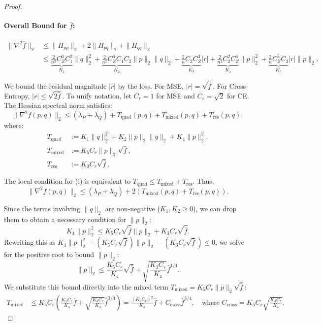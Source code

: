 \documentclass[a4paper,11pt]{article}
\newcommand{\1}{\mathbbm{1}}
\theoremstyle{plain}
\begin{document}
\begin{proof}
\paragraph{Overall Bound for $\bar{f}$:}
\begin{align}
\label{eq:transformers_hessian_bound}
    \|\nabla^2 \bar{f}\|_2 &\leq \|H_{pp}\|_2 + 2 \|H_{pq}\|_2 + \|H_{qq}\|_2 \nonumber \\ & 
    \leq \underbrace{\frac{2}{n^2} C_Z^6 C_1^2}_{K_1} \|q\|_2^2 + \underbrace{\frac{2}{n^2} C_Z^6 C_1 C_2}_{K_2} \|p\|_2 \|q\|_2 + \underbrace{\frac{2}{n} C_2 C_Z^3}_{K_3} |r| + \underbrace{\frac{2}{n^2} C_2^2 C_Z^6}_{K_4} \|p\|_2^2 + \underbrace{\frac{2}{n} C_Z^5 C_3}_{K_5} |r| \|p\|_2.
\end{align}

We bound the residual magnitude $|r|$ by the loss. For MSE, $|r| = \sqrt{\bar{f}}$. For Cross-Entropy, $|r| \le \sqrt{2\bar{f}}$. To unify notation, let $C_r=1$ for MSE and $C_r=\sqrt{2}$ for CE.
The Hessian spectral norm satisfies:
\begin{equation}
    \|\nabla^2 f(p,q)\|_2 \le (\lambda_P + \lambda_Q) + T_{\text{quad}}(p,q) + T_{\text{mixed}}(p,q) + T_{\text{res}}(p,q),
\end{equation}
where:
\begin{align*}
    T_{\text{quad}} &:= K_1 \|q\|_2^2 + K_2 \|p\|_2 \|q\|_2 + K_4 \|p\|_2^2, \\
    T_{\text{mixed}} &:= K_5 C_r \|p\|_2 \sqrt{\bar{f}}, \\
    T_{\text{res}} &:= K_3 C_r \sqrt{\bar{f}}.
\end{align*}




The local condition for (i) is equivalent to $T_{\text{quad}} \leq T_{\text{mixed}}+T_{\text{res}}.$ Thus,
\begin{equation*}
\|\nabla^2 f(p,q)\|_2 \leq (\lambda_P + \lambda_Q) + 2 (T_{\text{mixed}}(p,q) + T_{\text{res}}(p,q)).
\end{equation*}


Since the terms involving $\|q\|_2$ are non-negative ($K_1, K_2 \ge 0$), we can drop them to obtain a necessary condition for $\|p\|_2$:
\begin{equation*}
    K_4 \|p\|_2^2 \le K_5 C_r \sqrt{\bar{f}} \|p\|_2 + K_3 C_r \sqrt{\bar{f}}.
\end{equation*}
Rewriting this as $K_4 \|p\|_2^2 - (K_5 C_r \sqrt{\bar{f}}) \|p\|_2 - (K_3 C_r \sqrt{\bar{f}}) \le 0$, we solve for the positive root to bound $\|p\|_2$:
\begin{equation*}
    \|p\|_2 \le \frac{K_5 C_r}{K_4} \sqrt{\bar{f}} + \sqrt{\frac{K_3 C_r}{K_4}} \bar{f}^{1/4}.
\end{equation*}
We substitute this bound directly into the mixed term $T_{\text{mixed}} = K_5 C_r \|p\|_2 \sqrt{\bar{f}}$:
\begin{align*}
    T_{\text{mixed}} &\le K_5 C_r \left( \frac{K_5 C_r}{K_4} \bar{f} + \sqrt{\frac{K_3 C_r}{K_4}} \bar{f}^{3/4} \right) = \frac{(K_5 C_r)^2}{K_4} \bar{f} + C_{\text{cross}} \bar{f}^{3/4}, \quad \text{where } C_{\text{cross}} = K_5 C_r \sqrt{\frac{K_3 C_r}{K_4}}.
\end{align*}




\end{proof}
\end{document}
